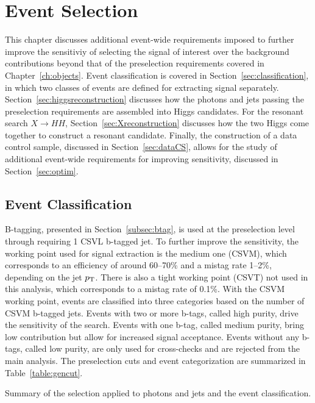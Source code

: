 \chapter{Event Selection\label{ch:selection}}

This chapter discusses additional event-wide requirements imposed to further
improve the sensitiviy of selecting the signal of interest over the background contributions
beyond that of the preselection requirements covered in Chapter~\ref{ch:objects}.
Event classification is covered in Section~\ref{sec:classification}, in which two classes of
events are defined for extracting signal separately.
Section~\ref{sec:higgsreconstruction} discusses how the photons and jets passing the preselection
requirements are assembled into Higgs candidates. For the resonant search $X\rightarrow HH$,
Section~\ref{sec:Xreconstruction} discusses how the two Higgs come together to construct a resonant
candidate. Finally, the construction of a data control
sample, discussed in Section~\ref{sec:dataCS}, allows for the study of additional event-wide
requirements for improving sensitivity, discussed in Section~\ref{sec:optim}.

\section{Event Classification\label{sec:classification}}

B-tagging, presented in Section~\ref{subsec:btag}, is used at the preselection level through
requiring 1 CSVL b-tagged jet. To further improve the sensitivity, the working point used for
signal extraction is the medium one (CSVM), which corresponds to an efficiency of around 60--70\%
and a mistag rate 1--2\%, depending on the jet $p_{\rm T}$.
There is also a tight working point (CSVT) not used in this analysis,
which corresponds to a mistag rate of 0.1\%.
With the CSVM working point, events are classified into three categories
based on the number of CSVM b-tagged jets. Events with two or more b-tags, called high purity,
drive the sensitivity of the search. Events with one b-tag, called medium purity,
bring low contribution but allow for increased signal acceptance. Events without any b-tags,
called low purity, are only used for cross-checks and are rejected from the main analysis.
The preselection cuts and event categorization
are summarized in Table~\ref{table:gencut}.

\begin{table}[ht]
  \centering
  \renewcommand{\arraystretch}{1.4}
  \caption{Summary of the selection applied to photons and jets and the event classification.}
  
  \label{table:gencut}
\end{table}

